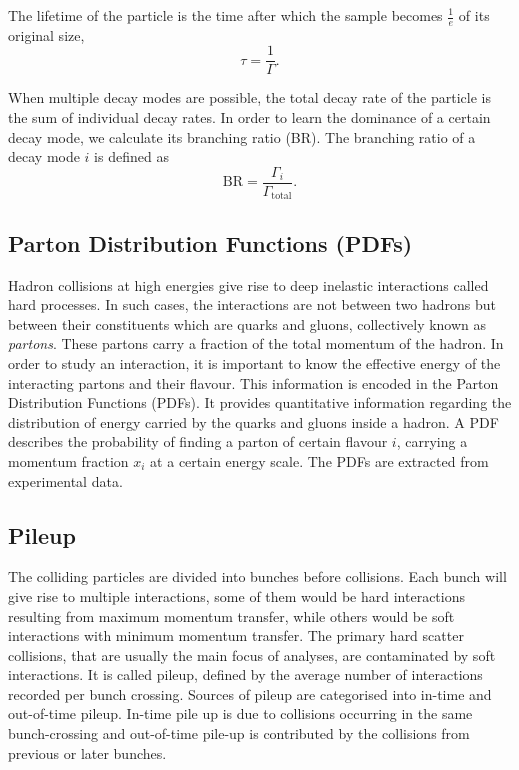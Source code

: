 The lifetime of the particle is the time after which the sample becomes $\frac{1}{e}$ of its original 
size,
\begin{equation}
    \tau = \frac{1}{\Gamma}.
\end{equation}

When multiple decay modes are possible, the total decay rate of the particle is the sum of individual 
decay rates. In order to learn the dominance of a certain decay mode, we calculate its branching 
ratio (BR). The branching ratio of a decay mode $i$ is defined as
\begin{equation}
    \text{BR} = \frac{\Gamma_i}{\Gamma_{\text{total}}}.
\end{equation}


\subsection*{Parton Distribution Functions (PDFs)}
Hadron collisions at high energies give rise to deep inelastic interactions called hard processes.
In such cases, the interactions are not between two hadrons but between their constituents which are
quarks and gluons, collectively known as \textit{partons}. These partons carry a fraction of the total
momentum of the hadron. In order to study an interaction, it is important to
know the effective energy of the interacting partons and their flavour. This information is encoded in 
the Parton Distribution Functions (PDFs). It provides quantitative information regarding the distribution
of energy carried by the quarks and gluons inside a hadron. A PDF
describes the probability of finding a parton of certain flavour $i$, carrying a momentum 
fraction $x_i$ at a certain energy scale. The PDFs are extracted from experimental data. 

\subsection*{Pileup}
The colliding particles are divided into bunches before collisions. Each bunch will give rise to
multiple interactions, some of them would be hard interactions resulting from maximum momentum transfer, while
others would be soft interactions with minimum momentum transfer. 
The primary hard scatter collisions, that are usually the main focus of analyses, are 
contaminated by soft interactions. It is called pileup, defined by the average number of interactions
recorded per bunch crossing. Sources of pileup are categorised into in-time and out-of-time pileup. In-time pile up is due to collisions
occurring in the same bunch-crossing and out-of-time pile-up is contributed by the collisions from previous
or later bunches. 

